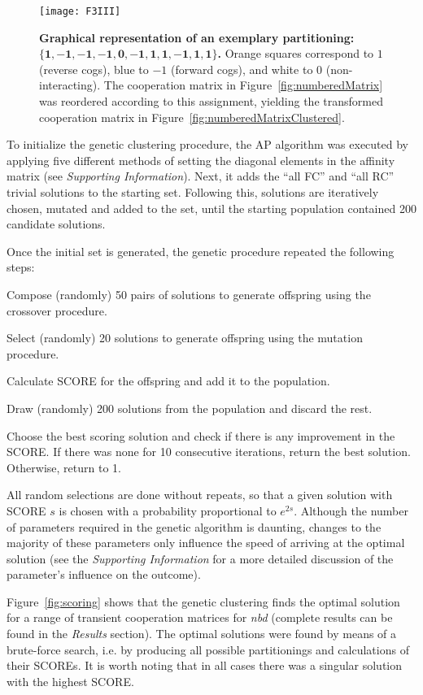\begin{figure}[H]
\centering
\texttt{[image: F3III]}
\caption{
{\bf Graphical representation of an exemplary partitioning: $\mathbf{\{1,-1,-1,-1,0,-1,1,1,-1,1,1 \}}$.}
Orange squares correspond to $1$ (reverse cogs), blue  to $-1$ (forward cogs), and white to $0$ (non-interacting).
The cooperation matrix in Figure~\ref{fig:numberedMatrix} was reordered according to this assignment, yielding the transformed cooperation matrix in Figure~\ref{fig:numberedMatrixClustered}.
}
\label{fig:numberedStripe}
\end{figure}

To initialize the genetic clustering procedure, the AP algorithm was {\color{black}executed by applying} five different methods of setting the diagonal elements in the affinity matrix (see \emph{Supporting Information}).
Next, it adds the ``all FC'' and ``all RC'' trivial solutions to the starting set.
Following this, solutions are iteratively chosen, mutated and added to the set, until the starting population contained 200 candidate solutions.

Once the initial set is generated, the genetic procedure repeated the following steps:
\begin{packedenum}
 \item Compose (randomly) 50 pairs of solutions to generate offspring using the crossover procedure.
 \item Select (randomly) 20 solutions to generate offspring using the mutation procedure.
 \item Calculate SCORE for the offspring and add it to the population.
 \item Draw (randomly) 200 solutions from the population and discard the rest.
 \item Choose the best scoring solution and check if there is any improvement in the SCORE. If there was none for 10 consecutive iterations, return the best solution. Otherwise, return to 1.
\end{packedenum}
All random selections are done without repeats, so that a given solution with SCORE $s$ is chosen with a probability proportional to $e^{2s}$.
{\color{black}Although} the number of parameters required in the genetic algorithm is daunting, changes to the majority of these parameters only influence the speed of arriving at the optimal solution (see the \emph{Supporting Information} for a more detailed discussion of the parameter's influence on the outcome).

Figure~\ref{fig:scoring} shows that the genetic clustering finds the optimal solution for a range of transient cooperation matrices for \emph{nbd} (complete results can be found in {\color{black}the \emph{Results} section}).
The optimal solution{\color{black}s were} found by means of a brute-force search, i.e. by producing all possible partitionings and calculations of their SCOREs.
It is worth noting that in all cases there was a singular solution with the highest SCORE.

